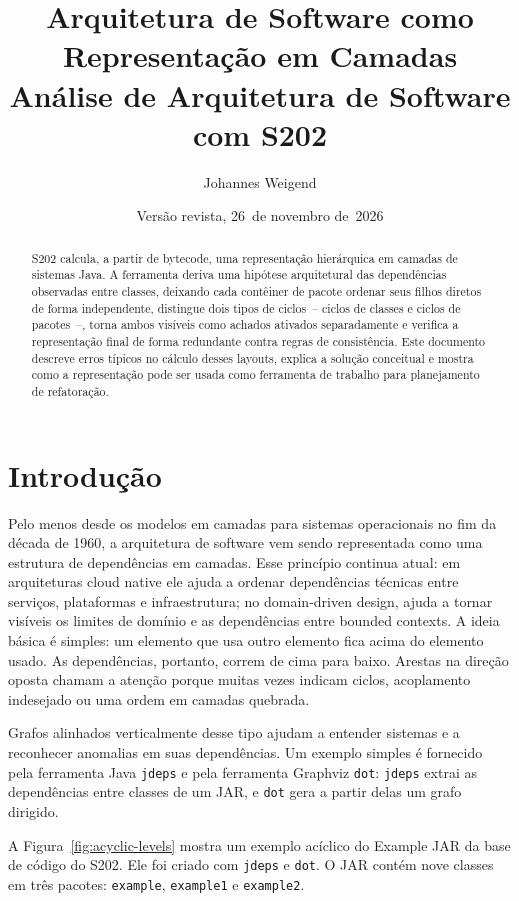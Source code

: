 \documentclass[a4paper,11pt]{article}
\title{Arquitetura de Software como Representa\c{c}\~ao em Camadas\\
  \large An\'alise de Arquitetura de Software com S202}
\author{Johannes Weigend}
\date{Vers\~ao revista, 26~de novembro de~2026}
\begin{document}
\maketitle

\begin{abstract}
S202 calcula, a partir de bytecode, uma representa\c{c}\~ao hier\'arquica em
camadas de sistemas Java. A ferramenta deriva uma hip\'otese arquitetural das
depend\^encias observadas entre classes, deixando cada cont\^einer de pacote
ordenar seus filhos diretos de forma independente, distingue dois tipos de
ciclos~--
ciclos de classes e ciclos de pacotes~--, torna ambos vis\'iveis como achados
ativados separadamente e verifica a representa\c{c}\~ao final de forma
redundante contra regras de consist\^encia. Este documento descreve erros
t\'ipicos no c\'alculo desses layouts, explica a solu\c{c}\~ao conceitual e
mostra como a representa\c{c}\~ao pode ser usada como ferramenta de trabalho
para planejamento de refatora\c{c}\~ao.
\end{abstract}

\section{Introdu\c{c}\~ao}

Pelo menos desde os modelos em camadas para sistemas operacionais no fim da
d\'ecada de 1960, a arquitetura de software vem sendo representada como uma
estrutura de depend\^encias em camadas. Esse princ\'ipio continua atual: em
arquiteturas cloud native ele ajuda a ordenar depend\^encias t\'ecnicas entre
servi\c{c}os, plataformas e infraestrutura; no domain-driven design, ajuda a
tornar vis\'iveis os limites de dom\'inio e as depend\^encias entre bounded
contexts. A ideia b\'asica \'e simples: um elemento que usa outro elemento
fica acima do elemento usado. As depend\^encias, portanto, correm de cima para
baixo. Arestas na dire\c{c}\~ao oposta chamam a aten\c{c}\~ao porque muitas
vezes indicam ciclos, acoplamento indesejado ou uma ordem em camadas
quebrada.

Grafos alinhados verticalmente desse tipo ajudam a entender sistemas e a
reconhecer anomalias em suas depend\^encias. Um exemplo simples \'e fornecido
pela ferramenta Java \texttt{jdeps} e pela ferramenta Graphviz \texttt{dot}:
\texttt{jdeps} extrai as depend\^encias entre classes de um JAR, e
\texttt{dot} gera a partir delas um grafo dirigido.

\newpage

A Figura~\ref{fig:acyclic-levels} mostra um exemplo ac\'iclico do Example JAR
da base de c\'odigo do S202. Ele foi criado com \texttt{jdeps} e \texttt{dot}.
O JAR cont\'em nove classes em tr\^es pacotes: \texttt{example},
\texttt{example1} e \texttt{example2}.
\end{document}

